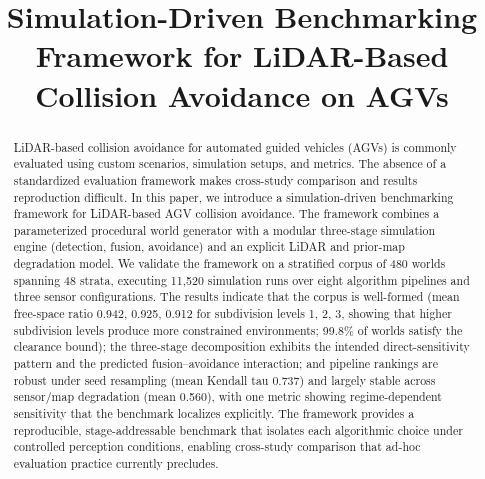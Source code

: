 \documentclass[conference]{IEEEtran}
\begin{document}
 
\title{Simulation-Driven Benchmarking Framework for LiDAR-Based Collision Avoidance on AGVs}
 
\author{
}
\maketitle

\begin{abstract}
LiDAR-based collision avoidance for automated guided vehicles (AGVs) is commonly evaluated using custom scenarios, simulation setups, and metrics. The absence of a standardized evaluation framework makes cross-study comparison and results reproduction difficult. In this paper, we introduce a simulation-driven benchmarking framework for LiDAR-based AGV collision avoidance. The framework combines a parameterized procedural world generator with a modular three-stage simulation engine (detection, fusion, avoidance) and an explicit LiDAR and prior-map degradation model. We validate the framework on a stratified corpus of 480 worlds spanning 48 strata, executing 11,520 simulation runs over eight algorithm pipelines and three sensor configurations. The results indicate that the corpus is well-formed (mean free-space ratio 0.942, 0.925, 0.912 for subdivision levels 1, 2, 3, showing that higher subdivision levels produce more constrained environments; 99.8\% of worlds satisfy the clearance bound); the three-stage decomposition exhibits the intended direct-sensitivity pattern and the predicted fusion--avoidance interaction; and pipeline rankings are robust under seed resampling (mean Kendall tau 0.737) and largely stable across sensor/map degradation (mean 0.560), with one metric showing regime-dependent sensitivity that the benchmark localizes explicitly. The framework provides a reproducible, stage-addressable benchmark that isolates each algorithmic choice under controlled perception conditions, enabling cross-study comparison that ad-hoc evaluation practice currently precludes.
\end{abstract}
\end{document}
